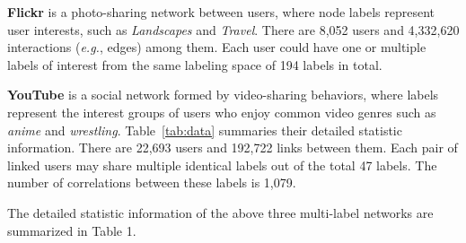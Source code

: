 \documentclass[conference]{IEEEtran}
\begin{document}
\textbf{Flickr} is a photo-sharing network between users, where node labels represent user interests, such as \textit{Landscapes} and \textit{Travel}. There are 8,052 users and 4,332,620 interactions (\textit{e.g.}, edges) among them. Each user could have one or multiple labels of interest from the same labeling space of 194 labels in total. 

\textbf{YouTube} is a social network formed by video-sharing behaviors, where labels represent the interest groups of users who enjoy common video genres such as \textit{anime} and \textit{wrestling}. Table~\ref{tab:data} summaries their detailed statistic information. There are 22,693 users and 192,722 links between them. Each pair of linked users may share multiple identical labels out of the total 47 labels. The number of correlations between these labels is 1,079.

The detailed statistic information of the above three multi-label networks are summarized in Table 1.
\end{document}
